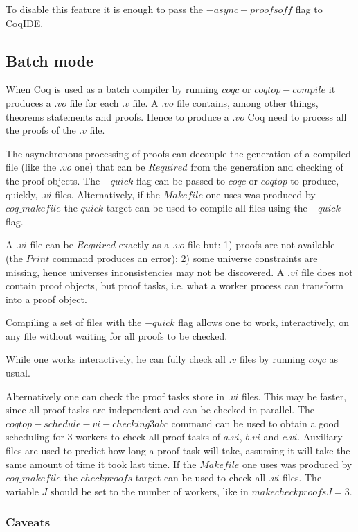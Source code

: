 To disable this feature it is enough to pass the $-async-proofs off$ flag to
CoqIDE.

\subsection{Batch mode}

When Coq is used as a batch compiler by running $coqc$ or $coqtop -compile$
it produces a $.vo$ file for each $.v$ file.  A $.vo$ file contains, among
other things, theorems statements and proofs.  Hence to produce a $.vo$
Coq need to process all the proofs of the $.v$ file.

The asynchronous processing of proofs can decouple the generation of a
compiled file (like the $.vo$ one) that can be $Required$ from the generation
and checking of the proof objects.  The $-quick$ flag can be passed to
$coqc$ or $coqtop$ to produce, quickly, $.vi$ files.  Alternatively, if
the $Makefile$ one uses was produced by $coq\_makefile$ the $quick$
target can be used to compile all files using the $-quick$ flag.

A $.vi$ file can be $Required$ exactly as a $.vo$ file but: 1) proofs are
not available (the $Print$ command produces an error); 2) some universe
constraints are missing, hence universes inconsistencies may not be
discovered.  A $.vi$ file does not contain proof objects, but proof tasks,
i.e. what a worker process can transform into a proof object.

Compiling a set of files with the $-quick$ flag allows one to work,
interactively, on any file without waiting for all proofs to be checked.

While one works interactively, he can fully check all $.v$ files by
running $coqc$ as usual.

Alternatively one can check the proof tasks store in $.vi$ files.  This may be
faster, since all proof tasks are independent and can be checked in parallel.
The $coqtop -schedule-vi-checking 3 a b c$ command can be used to obtain
a good scheduling for 3 workers to check all proof tasks of $a.vi$, $b.vi$ and
$c.vi$.  Auxiliary files are used to predict how long a proof task will take,
assuming it will take the same amount of time it took last time.
If the $Makefile$ one uses was produced by $coq\_makefile$ the $checkproofs$
target can be used to check all $.vi$ files.  The variable $J$ should be
set to the number of workers, like in $make checkproofs J=3$.

\subsubsection{Caveats}


